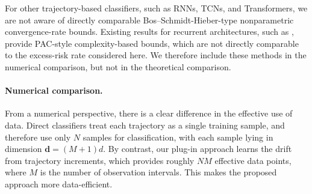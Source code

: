 \documentclass{article}
\theoremstyle{plain}
\theoremstyle{definition}
\theoremstyle{remark}
\begin{document}
For other trajectory-based classifiers, such as RNNs, TCNs, and Transformers, 
we are not aware of directly comparable Bos--Schmidt-Hieber-type nonparametric 
convergence-rate bounds. Existing results for 
recurrent architectures, such as \citet{chen2020generalization}, provide 
PAC-style complexity-based bounds, which are not directly comparable to the 
excess-risk rate considered here. We therefore include these methods in the 
numerical comparison, but not in the theoretical comparison.


\paragraph{Numerical comparison.}
From a numerical perspective, there is a clear difference in the effective use of data. Direct classifiers treat each trajectory as a single training sample, and therefore use only \(N\) samples for classification, with each sample lying in dimension \(\mathbf d=(M+1)d\). By contrast, our plug-in approach learns the drift from trajectory increments, which provides roughly \(NM\) effective data points, where \(M\) is the number of observation intervals. This makes the proposed approach more data-efficient.
\end{document}
